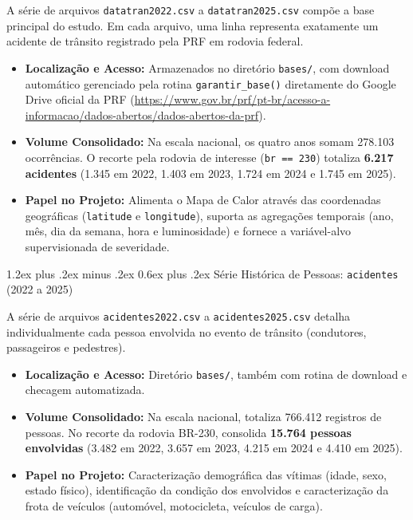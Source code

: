 \documentclass[11pt,a4paper]{article}
\makeatletter
\renewcommand\subsection{
\@startsection{subsection}{2}{0pt}%
{1.2ex plus .2ex minus .2ex}%
{0.6ex plus .2ex}%
{\normalfont\large\bfseries\color{secondary}}
}
\makeatother
\begin{document}
A série de arquivos \texttt{datatran2022.csv} a \texttt{datatran2025.csv} compõe a base principal do estudo. Em cada arquivo, uma linha representa exatamente um acidente de trânsito registrado pela PRF em rodovia federal.
\begin{itemize}
    \item \textbf{Localização e Acesso:} Armazenados no diretório \texttt{bases/}, com download automático gerenciado pela rotina \texttt{garantir\_base()} diretamente do Google Drive oficial da PRF (\url{https://www.gov.br/prf/pt-br/acesso-a-informacao/dados-abertos/dados-abertos-da-prf}).
    \item \textbf{Volume Consolidado:} Na escala nacional, os quatro anos somam 278.103 ocorrências. O recorte pela rodovia de interesse (\texttt{br == 230}) totaliza \textbf{6.217 acidentes} (1.345 em 2022, 1.403 em 2023, 1.724 em 2024 e 1.745 em 2025).
    \item \textbf{Papel no Projeto:} Alimenta o Mapa de Calor através das coordenadas geográficas (\texttt{latitude} e \texttt{longitude}), suporta as agregações temporais (ano, mês, dia da semana, hora e luminosidade) e fornece a variável-alvo supervisionada de severidade.
\end{itemize}

\subsection{Série Histórica de Pessoas: \texttt{acidentes} (2022 a 2025)}

A série de arquivos \texttt{acidentes2022.csv} a \texttt{acidentes2025.csv} detalha individualmente cada pessoa envolvida no evento de trânsito (condutores, passageiros e pedestres).
\begin{itemize}
    \item \textbf{Localização e Acesso:} Diretório \texttt{bases/}, também com rotina de download e checagem automatizada.
    \item \textbf{Volume Consolidado:} Na escala nacional, totaliza 766.412 registros de pessoas. No recorte da rodovia BR-230, consolida \textbf{15.764 pessoas envolvidas} (3.482 em 2022, 3.657 em 2023, 4.215 em 2024 e 4.410 em 2025).
    \item \textbf{Papel no Projeto:} Caracterização demográfica das vítimas (idade, sexo, estado físico), identificação da condição dos envolvidos e caracterização da frota de veículos (automóvel, motocicleta, veículos de carga).
\end{itemize}
\end{document}
